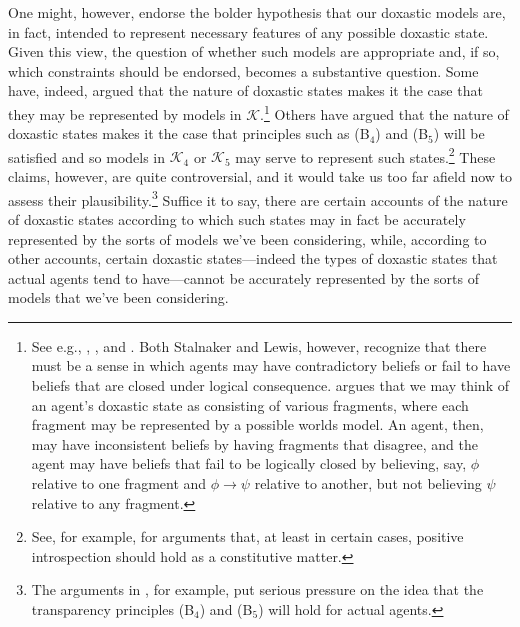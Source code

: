 One might, however, endorse the bolder hypothesis that our doxastic models are, in fact, intended to represent necessary features of any possible doxastic state.
Given this view, the question of whether such models are appropriate and, if so, which constraints should be endorsed, becomes a substantive question.
Some have, indeed, argued that the nature of doxastic states makes it the case that they may be represented by models in $\mathcal{K}$.\footnote{See e.g., \citet{Stalnaker2}, \citet{Lewis4}, and \citet{Lewis5}. Both Stalnaker and Lewis, however, recognize that there must be a sense in which agents may have contradictory beliefs or fail to have beliefs that are closed under logical consequence. \citet{Lewis6} argues that we may think of an agent's doxastic state as consisting of various fragments, where each fragment may be represented by a possible worlds model. An agent, then, may have inconsistent beliefs by having fragments that disagree, and the agent may have beliefs that fail to be logically closed by believing, say, $\phi$ relative to one fragment and $\phi \rightarrow \psi$ relative to another, but not believing $\psi$ relative to any fragment.}
Others have argued that the nature of doxastic states makes it the case that principles such as (B$_4$) and (B$_5$) will be satisfied and so models in $\mathcal{K}_4$ or $\mathcal{K}_5$ may serve to represent such states.\footnote{See, for example, \citet{Shoemaker2,Shoemaker1} for arguments that, at least in certain cases, positive introspection should hold as a constitutive matter.}
These claims, however, are quite controversial, and it would take us too far afield now to assess their plausibility.\footnote{The arguments in \citet{Williamson4}, for example, put serious pressure on the idea that the transparency principles (B$_4$) and (B$_5$) will hold for actual agents.}
Suffice it to say, there are certain accounts of the nature of doxastic states according to which such states may in fact be accurately represented by the sorts of models we've been considering, while, according to other accounts, certain doxastic states---indeed the types of doxastic states that actual agents tend to have---cannot be accurately represented by the sorts of models that we've been considering.

